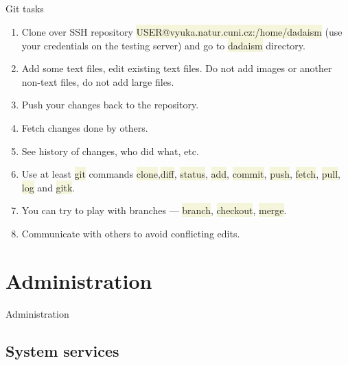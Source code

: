 \documentclass[compress, ucs, xelatex, 11pt, xcolor=svgnames, aspectratio=169,
	hyperref={
		bookmarks=true,
		unicode=true,
		colorlinks=true,
		pdftitle={Linux, command line and MetaCentrum},
		plainpages=false,
		pdfauthor={Vojtech Zeisek},
		pdfsubject={Course about use of Linux command line, writing shell scripts and using MetaCentrum of CESNET},
		pdfcreator={XeLaTeX},
		pdfkeywords={Linux, GNU, BASH, shell, command line, MetaCentrum},
		linkcolor=DarkRed, %
		anchorcolor=DarkBlue, %
		citecolor=Indigo, %
		filecolor=NavyBlue, %
		menucolor=DarkMagenta, %
		urlcolor=DarkBlue, %
		pdftex},
	url={hyphens, lowtilde} %
	]{beamer}
\renewcommand{\texttt}[1]{\colorbox{Beige}{{\ttfamily #1}}}
\begin{document}
\subsection{}

\begin{frame}{Git tasks}
	\begin{enumerate}
		\item Clone over SSH repository \texttt{USER@vyuka.natur.cuni.cz:/home/dadaism} (use your credentials on the testing server) and go to \texttt{dadaism} directory.
		\item Add some text files, edit existing text files. Do not add images or another non-text files, do not add large files.
		\item Push your changes back to the repository.
		\item Fetch changes done by others.
		\item See history of changes, who did what, etc.
		\item Use at least \texttt{git} commands \texttt{clone},\texttt{diff}, \texttt{status}, \texttt{add}, \texttt{commit}, \texttt{push}, \texttt{fetch}, \texttt{pull}, \texttt{log} and \texttt{gitk}.
		\item You can try to play with branches --- \texttt{branch}, \texttt{checkout}, \texttt{merge}.
		\item Communicate with others to avoid conflicting edits.
	\end{enumerate}
\end{frame}

\section{Administration}

\begin{frame}{Administration}
	\tableofcontents[currentsection, sectionstyle=show/hide, hideothersubsections]
\end{frame}


\subsection{System services}
\end{document}
